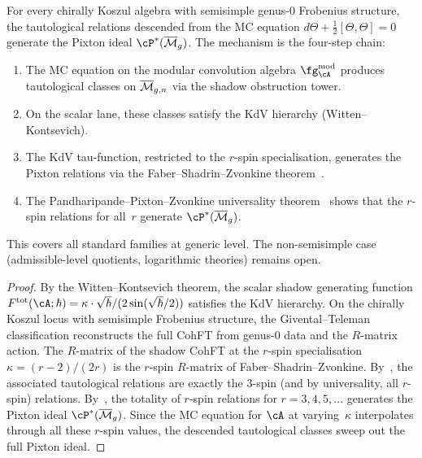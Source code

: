 \begin{theorem}
\label{thm:pixton-semisimple}
\ClaimStatusProvedHere
For every chirally Koszul algebra with semisimple genus-$0$
Frobenius structure, the tautological relations descended from
the MC equation $d\Theta + \tfrac{1}{2}[\Theta, \Theta] = 0$
generate the Pixton ideal
$\cP^*(\overline{\cM}_g)$. The mechanism is the four-step
chain:
\begin{enumerate}[label=\textup{(\roman*)}]
\item The MC equation on the modular convolution algebra
 $\fg^{\mathrm{mod}}_\cA$ produces tautological classes on
 $\overline{\mathcal M}_{g,n}$ via the shadow obstruction tower.
\item On the scalar lane, these classes satisfy the KdV
 hierarchy \textup{(}Witten--Kontsevich\textup{)}.
\item The KdV tau-function, restricted to the $r$-spin
 specialisation, generates the Pixton relations via the
 Faber--Shadrin--Zvonkine theorem~\cite{FSZ10}.
\item The Pandharipande--Pixton--Zvonkine universality
 theorem~\cite{PPZ15} shows that the $r$-spin relations
 for all~$r$ generate $\cP^*(\overline{\cM}_g)$.
\end{enumerate}
This covers all standard families at generic level. The
non-semisimple case \textup{(}admissible-level quotients,
logarithmic theories\textup{)} remains open.
\end{theorem}

\begin{proof}
By the Witten--Kontsevich theorem, the scalar shadow
generating function
$F^{\mathrm{tot}}(\cA; \hbar) = \kappa \cdot
\sqrt{\hbar}/(2\sin(\sqrt{\hbar}/2))$ satisfies the KdV hierarchy.
On the chirally Koszul locus with semisimple Frobenius
structure, the Givental--Teleman classification reconstructs
the full CohFT from genus-$0$ data and the $R$-matrix
action. The $R$-matrix of the shadow CohFT at the $r$-spin
specialisation $\kappa = (r-2)/(2r)$ is the $r$-spin
$R$-matrix of Faber--Shadrin--Zvonkine. By~\cite{FSZ10},
the associated tautological relations are exactly the
$3$-spin (and by universality, all $r$-spin) relations.
By~\cite{PPZ15}, the totality of $r$-spin relations for
$r = 3, 4, 5, \ldots$ generates the Pixton ideal
$\cP^*(\overline{\cM}_g)$. Since the MC equation for
$\cA$ at varying~$\kappa$ interpolates through all these
$r$-spin values, the descended tautological classes sweep
out the full Pixton ideal.
\end{proof}


